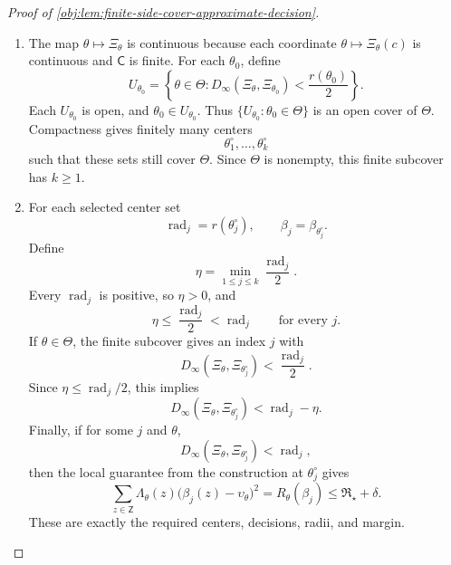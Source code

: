 \documentclass[11pt]{article}
\begin{document}
\begin{proof}[Proof of \cref{obj:lem:finite-side-cover-approximate-decision}]
\begin{enumerate}
Apply the convergence with \(\mathfrak b=V_{\mathrm{fib}}(\theta_0)+\delta/2\). Choose an integer \(N_{\theta_0}\ge0\) with
\[
V_{1/(N_{\theta_0}+1)}(\theta_0)
<
V_{\mathrm{fib}}(\theta_0)+\delta/2 .
\]
Set
\[
r(\theta_0)=\frac1{N_{\theta_0}+1}>0 .
\]
Together with \(V_{\mathrm{fib}}(\theta_0)\le\mathfrak R_\star\), this gives
\[
V_{r(\theta_0)}(\theta_0)<\mathfrak R_\star+\delta .
\]
Since all risks are nonnegative, the range of worst-case risks over admissible decisions is bounded below by \(0\). Hence the strict inequality for the infimum yields a decision
\[
\beta_{\theta_0}:\mathsf Z\to[l,u]
\]
such that
\[
\sup_{\theta:\,D_\infty(\Xi_\theta,\Xi_{\theta_0})\le r(\theta_0)}
R_\theta(\beta_{\theta_0})
<
\mathfrak R_\star+\delta .
\]
Consequently, whenever
\[
D_\infty(\Xi_\theta,\Xi_{\theta_0})<r(\theta_0),
\]
the same \(\theta\) belongs to the closed neighborhood, and therefore
\[
R_\theta(\beta_{\theta_0})\le \mathfrak R_\star+\delta .
\]

\item The map \(\theta\mapsto\Xi_\theta\) is continuous because each coordinate \(\theta\mapsto\Xi_\theta(c)\) is continuous and \(\mathsf C\) is finite. For each \(\theta_0\), define
\[
U_{\theta_0}
=
\left\{\theta\in\Theta:
D_\infty(\Xi_\theta,\Xi_{\theta_0})<\frac{r(\theta_0)}2
\right\}.
\]
Each \(U_{\theta_0}\) is open, and \(\theta_0\in U_{\theta_0}\). Thus \(\{U_{\theta_0}:\theta_0\in\Theta\}\) is an open cover of \(\Theta\). Compactness gives finitely many centers
\[
\theta^\circ_1,\ldots,\theta^\circ_k
\]
such that these sets still cover \(\Theta\). Since \(\Theta\) is nonempty, this finite subcover has \(k\ge1\). %

\item For each selected center set
\[
\operatorname{rad}_j=r(\theta^\circ_j),
\qquad
\beta_j=\beta_{\theta^\circ_j}.
\]
Define
\[
\eta=\min_{1\le j\le k}\frac{\operatorname{rad}_j}{2}.
\]
Every \(\operatorname{rad}_j\) is positive, so \(\eta>0\), and
\[
\eta\le \frac{\operatorname{rad}_j}{2}<\operatorname{rad}_j
\qquad\text{for every }j.
\]
If \(\theta\in\Theta\), the finite subcover gives an index \(j\) with
\[
D_\infty(\Xi_\theta,\Xi_{\theta^\circ_j})
<
\frac{\operatorname{rad}_j}{2}.
\]
Since \(\eta\le\operatorname{rad}_j/2\), this implies
\[
D_\infty(\Xi_\theta,\Xi_{\theta^\circ_j})
<
\operatorname{rad}_j-\eta .
\]
Finally, if for some \(j\) and \(\theta\),
\[
D_\infty(\Xi_\theta,\Xi_{\theta^\circ_j})<\operatorname{rad}_j,
\]
then the local guarantee from the construction at \(\theta^\circ_j\) gives
\[
\sum_{z\in\mathsf Z}\Lambda_\theta(z)
\bigl(\beta_j(z)-\upsilon_\theta\bigr)^2
=
R_\theta(\beta_j)
\le \mathfrak R_\star+\delta .
\]
These are exactly the required centers, decisions, radii, and margin. %
\end{enumerate}
\end{proof}
\end{document}
